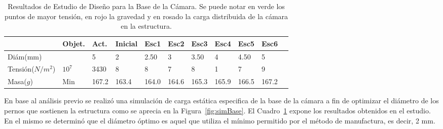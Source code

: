 \begin{table}[!ht]
\begin{adjustbox}{width=\columnwidth,center}
\centering
\small
    \begin{tabularx}{\textwidth}{|l|X|l|l|l|l|l|l|l|l|l|}
    \hline
        ~ & Objet. & Act. & Inicial & Esc1 & Esc2 & Esc3 & Esc4 & Esc5 & Esc6\\ \hline
        Diám(mm) & ~ & 5 & 2 & 2.50 & 3 & 3.50 & 4 & 4.50 & 5 \\ \hline
        Tensión($N/m^2$) & $10^7$ & 3430 & 8 & 8 & 7 & 8 & 1 & 7 & 9\\ \hline
        Masa($g$) & Min& 167.2 & 163.4 & 164.0 & 164.6 & 165.3 & 165.9 & 166.5 & 167.2\\ \hline
    \end{tabularx}
    \end{adjustbox}
    \label{tab:estudioDisenoBase}
    \caption{Resultados de Estudio de Diseño para la Base de la Cámara. Se puede notar en verde los puntos de mayor tensión, en rojo la gravedad y en rosado la carga distribuida de la cámara en la estructura.}
\end{table}

En base al análisis previo se realizó una simulación de carga estática especifica de la base de la cámara a fin de optimizar el diámetro de los pernos que sostienen la estructura como se aprecia en la Figura~\ref{fig:simBase}.
El Cuadro~\ref{tab:estudioDisenoBase} expone los resultados obtenidos en el estudio. En el mismo se determinó que el diámetro óptimo es aquel que utiliza el mínimo permitido por el método de manufactura, es decir, 2 mm. 